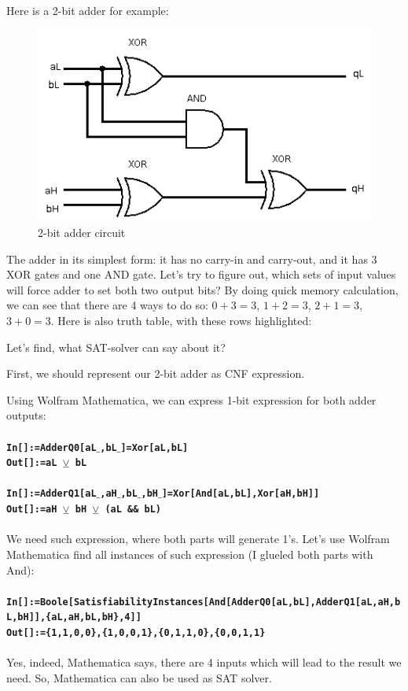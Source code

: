 Here is a 2-bit adder for example:

\begin{figure}[ht!]
\centering
\includegraphics[scale=0.75]{SAT/adder_logisim.png}
\caption{2-bit adder circuit}
\end{figure}

The adder in its simplest form: it has no carry-in and carry-out, and it has 3 XOR gates and one AND gate.
Let's try to figure out, which sets of input values will force adder to set both two output bits?
By doing quick memory calculation, we can see that there are 4 ways to do so: $0+3=3$, $1+2=3$, $2+1=3$, $3+0=3$.
Here is also truth table, with these rows highlighted:



Let's find, what \ac{SAT}-solver can say about it?

First, we should represent our 2-bit adder as \ac{CNF} expression.

Using Wolfram Mathematica, we can express 1-bit expression for both adder outputs:\\
\\
\textbf{\texttt{In[]:=AdderQ0[aL$\_$,bL$\_$]=Xor[aL,bL]}} \\
\textbf{\texttt{Out[]:=aL $\veebar$ bL}} \\
\\
\textbf{\texttt{In[]:=AdderQ1[aL$\_$,aH$\_$,bL$\_$,bH$\_$]=Xor[And[aL,bL],Xor[aH,bH]]}} \\
\textbf{\texttt{Out[]:=aH $\veebar$ bH $\veebar$ (aL \&\& bL)}} \\
\\
We need such expression, where both parts will generate 1's.
Let's use Wolfram Mathematica find all instances of such expression (I glueled both parts with And): \\
\\
\textbf{\texttt{In[]:=Boole[SatisfiabilityInstances[And[AdderQ0[aL,bL],AdderQ1[aL,aH,bL,bH]],\{aL,aH,bL,bH\},4]]}} \\
\textbf{\texttt{Out[]:=\{1,1,0,0\},\{1,0,0,1\},\{0,1,1,0\},\{0,0,1,1\}}} \\
\\
Yes, indeed, Mathematica says, there are 4 inputs which will lead to the result we need.
So, Mathematica can also be used as \ac{SAT} solver.

